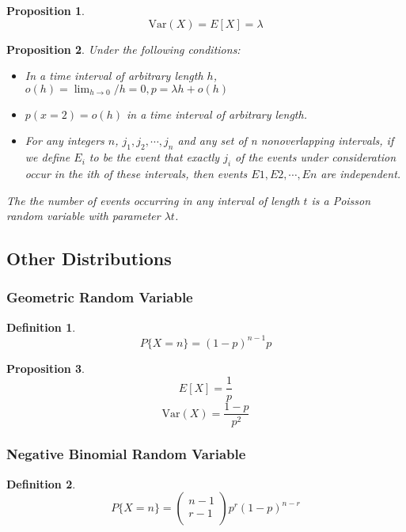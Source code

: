\documentclass[12pt]{article}
\newtheorem{definition}{Definition}[subsection]
\newtheorem{proposition}{Proposition}[subsection]
\begin{document}
        \begin{proposition}
        	\[\mathrm{Var}(X) = E[X] = \lambda\]
        \end{proposition}
        
        \begin{proposition}
        	Under the following conditions:
        		\begin{itemize}
        			\item In a time interval of arbitrary length $h$, $o(h) = \lim_{h \rightarrow 0}/h = 0, p = \lambda h + o(h)$
        			\item $p(x = 2) = o(h)$ in a time interval of arbitrary length.
        			\item For any integers $n$, $j_1 , j_2 , \cdots , j_n$ and any set of n nonoverlapping intervals, if we define $E_i$ to be the event that exactly $j_i$ of the events under consideration occur in the ith of these intervals, then events $E1 , E2 , \cdots , En$ are independent. 
        		\end{itemize}
        		
        		The the number of events occurring in any interval of length $t$ is a Poisson random variable with parameter $\lambda t$.
        \end{proposition}
        \subsection{Other Distributions}
            \subsubsection{Geometric Random Variable}
                \begin{definition}
                    \[P\{X = n\} = (1-p)^{n - 1}p\]
                \end{definition}
                
                \begin{proposition}
                	\[E[X] = \frac{1}{p}\]
                	\[\mathrm{Var}(X) = \frac{1 - p}{p^2}\]
                \end{proposition}
                
            \subsubsection{Negative Binomial Random Variable}
                \begin{definition}
                    \[P\{X = n\} = \left(\begin{array}{c} n - 1\\ r - 1\\ \end{array}\right)p^r(1-p)^{n-r}\]
                \end{definition}
\end{document}
